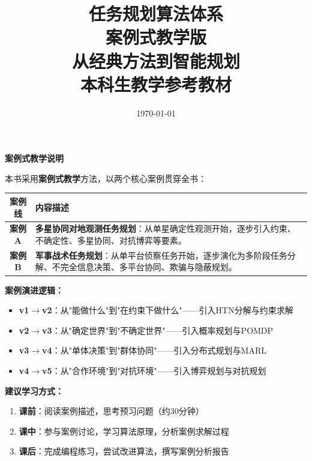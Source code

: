 \documentclass[a4paper,12pt,openany]{ctexbook}
\title{{\Huge\bfseries 任务规划算法体系}\\[0.8em]
{\Large 案例式教学版}\\[0.5em]
{\large 从经典方法到智能规划}\\[2em]
{\normalsize\color{gray} 本科生教学参考教材}}
\author{}
\date{\today}
\theoremstyle{definition}
\theoremstyle{plain}
\begin{document}
\maketitle

\thispagestyle{empty}
\vspace*{2cm}
\begin{center}
{\Large\bfseries 案例式教学说明}
\end{center}
\vspace{1cm}

\noindent 本书采用\textbf{案例式教学}方法，以两个核心案例贯穿全书：

\vspace{1em}

\begin{center}
\begin{tabular}{cp{10cm}}
\toprule
\textbf{案例线} & \textbf{内容描述} \\
\midrule
\textcolor{caseAcolor}{\textbf{案例A}} & \textbf{多星协同对地观测任务规划}：从单星确定性观测开始，逐步引入约束、不确定性、多星协同、对抗博弈等要素。 \\[0.8em]
\textcolor{caseBcolor}{\textbf{案例B}} & \textbf{军事战术任务规划}：从单平台侦察任务开始，逐步演化为多阶段任务分解、不完全信息决策、多平台协同、欺骗与隐蔽规划。 \\
\bottomrule
\end{tabular}
\end{center}

\vspace{1.5em}

\noindent\textbf{案例演进逻辑：}
\begin{itemize}[leftmargin=2em]
  \item \textbf{v1$\rightarrow$v2}：从"能做什么"到"在约束下做什么"——引入HTN分解与约束求解
  \item \textbf{v2$\rightarrow$v3}：从"确定世界"到"不确定世界"——引入概率规划与POMDP
  \item \textbf{v3$\rightarrow$v4}：从"单体决策"到"群体协同"——引入分布式规划与MARL
  \item \textbf{v4$\rightarrow$v5}：从"合作环境"到"对抗环境"——引入博弈规划与对抗规划
\end{itemize}

\vspace{1.5em}

\noindent\textbf{建议学习方式：}
\begin{enumerate}[leftmargin=2em]
  \item \textbf{课前}：阅读案例描述，思考预习问题（约30分钟）
  \item \textbf{课中}：参与案例讨论，学习算法原理，分析案例求解过程
  \item \textbf{课后}：完成编程练习，尝试改进算法，撰写案例分析报告
\end{enumerate}
\end{document}
